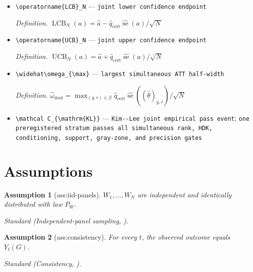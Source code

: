 \documentclass{article}
\newtheorem{assumption}{Assumption}
\begin{document}
\begin{itemize}
  \item \texttt{\textbackslash{}\allowbreak{}operatorname\{LCB\}\allowbreak{}\_\allowbreak{}N} --- \texttt{joint lower confidence endpoint}
  \par\smallskip\noindent\emph{Definition.} \(\operatorname{LCB}_N(a)=\widehat a-\widehat q_{\mathrm{cert}}\widehat{\operatorname{se}}(a)/\sqrt N\)
  \item \texttt{\textbackslash{}\allowbreak{}operatorname\{UCB\}\allowbreak{}\_\allowbreak{}N} --- \texttt{joint upper confidence endpoint}
  \par\smallskip\noindent\emph{Definition.} \(\operatorname{UCB}_N(a)=\widehat a+\widehat q_{\mathrm{cert}}\widehat{\operatorname{se}}(a)/\sqrt N\)
  \item \texttt{\textbackslash{}\allowbreak{}widehat\textbackslash{}\allowbreak{}omega\_\allowbreak{}\{\textbackslash{}\allowbreak{}max\}\allowbreak{}} --- \texttt{largest simultaneous ATT half-\allowbreak{}width}
  \par\smallskip\noindent\emph{Definition.} \(\widehat\omega_{\max}=\max_{(g,r)\in\mathcal G}\widehat q_{\mathrm{cert}}\widehat{\operatorname{se}}((\widehat\theta)_{g,r})/\sqrt N\)
  \item \texttt{\textbackslash{}\allowbreak{}mathcal C\_\allowbreak{}\{\textbackslash{}\allowbreak{}mathrm\{KL\}\allowbreak{}\}\allowbreak{}} --- \texttt{Kim-\allowbreak{}-\allowbreak{}Lee joint empirical pass event}; \texttt{one preregistered stratum passes all simultaneous rank,\allowbreak{} HDK,\allowbreak{} conditioning,\allowbreak{} support,\allowbreak{} gray-\allowbreak{}zone,\allowbreak{} and precision gates}
\end{itemize}

\section{Assumptions}

\begin{assumption}[ass:iid-panels]\label{ass:iid-panels}
\(W_1,\ldots,W_N\) are independent and identically distributed with law \(P_W\).
\par\smallskip\noindent\emph{Standard} (Independent-panel sampling, \cite{CallawaySantAnna2021DiD}).
\end{assumption}

\begin{assumption}[ass:consistency]\label{ass:consistency}
For every \(t\), the observed outcome equals \(Y_t(G)\).
\par\smallskip\noindent\emph{Standard} (Consistency, \cite{CallawaySantAnna2021DiD}).
\end{assumption}
\end{document}
